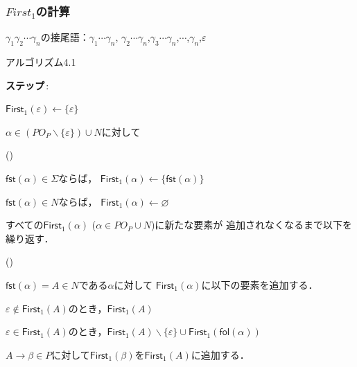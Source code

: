 \documentclass[dvipdfmx]{beamer}
\newcounter{coffee}
\begin{document}
\begin{frame}
  \frametitle{$First_1$の計算}
  {\scriptsize

    $\gamma_1\gamma_2\cdots\gamma_n$の接尾語：$\gamma_1\cdots\gamma_n$,
    $\gamma_2\cdots\gamma_n$,$\gamma_3\cdots\gamma_n$,$\cdots$,$\gamma_n$,$\varepsilon$
  }

  {\scriptsize
    \begin{itembox}[l]{アルゴリズム4.1}

      \begin{list}{{\bf ステップ}\,{\rm{}:}}{}
        \item $\mathsf{First}_1(\varepsilon)\leftarrow\{\varepsilon\}$
        \item $\alpha\in (PO_P\backslash\{\varepsilon\})\cup N$に対して
              \begin{list}{()}{}
                \item $\mathsf{fst}(\alpha)\in\Sigma$ならば，
                      $\mathsf{First}_1(\alpha)\leftarrow \{\mathsf{fst}(\alpha)\}$
                \item $\mathsf{fst}(\alpha)\in N$ならば，
                      $\mathsf{First}_1(\alpha)\leftarrow \varnothing$
              \end{list}
        \item すべての$\mathsf{First}_1(\alpha)$ ($\alpha\in PO_P\cup N$)に新たな要素が
              追加されなくなるまで以下を繰り返す．
              \begin{list}{()}{}
                \item $\mathsf{fst}(\alpha)=A\in N$である$\alpha$に対して
                      $\mathsf{First}_1(\alpha)$に以下の要素を追加する．
                      \begin{list}{}{}
                        \item $\varepsilon\notin\mathsf{First}_1(A)$のとき，$\mathsf{First}_1(A)$
                        \item $\varepsilon\in\mathsf{First}_1(A)$のとき，$\mathsf{First}_1(A)\backslash\{\varepsilon\}\cup\mathsf{First}_1(\mathsf{fol}(\alpha))$
                      \end{list}
                \item $A\rightarrow\beta\in P$に対して$\mathsf{First}_1(\beta)$を$\mathsf{First}_1(A)$に追加する．
              \end{list}
      \end{list}

\end{itembox}}
\end{frame}
\end{document}
